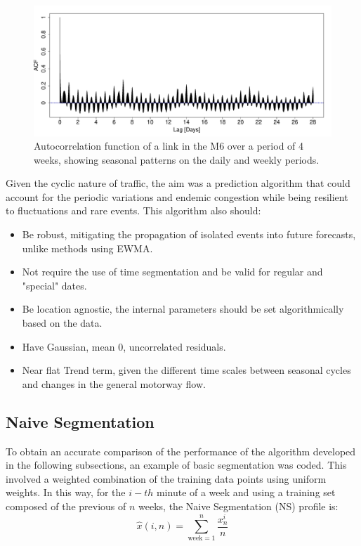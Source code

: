 \documentclass[conference, letterpaper]{IEEEtran}
\begin{document}
\begin{figure}[htbp]
	\centerline{\includegraphics[width=\linewidth]{./images/finalplots/ACF_M6_Link3.pdf}}
	\caption{Autocorrelation function of a link in the M6 over a period of 4 weeks, showing seasonal patterns on the daily and weekly periods.}
	\label{fig:acf}
\end{figure}

Given the cyclic nature of traffic, the aim was a prediction algorithm that could account for the periodic variations and endemic congestion while being resilient to fluctuations and rare events. This algorithm also should:
\begin{itemize}
	\item Be robust, mitigating the propagation of isolated events into future forecasts, unlike methods using EWMA.
	\item Not require the use of time segmentation and be valid for regular and "special" dates.
	\item Be location agnostic, the internal parameters should be set algorithmically based on the data.
	\item Have Gaussian, mean 0, uncorrelated residuals.
	\item Near flat Trend term, given the different time scales between seasonal cycles and changes in the general motorway flow.
\end{itemize}

\subsection{Naive Segmentation}
To obtain an accurate comparison of the performance of the algorithm developed in the following subsections, an example of basic segmentation was coded. 
This involved a weighted combination of the training data points using uniform weights. 
In this way, for the $i-th$ minute of a week and using a training set composed of the previous of $n$ weeks, the Naive Segmentation (NS) profile is:
\begin{equation}
\hat{x}(i,n) = \sum_{\textrm{week}=1}^{n} \frac{x^i_n}{n} 
\end{equation}
\end{document}
